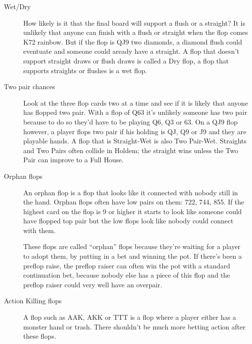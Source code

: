 \begin{description}

\item[Wet/Dry] How likely is it that the final board will support a
flush or a straight? It is unlikely that anyone can finish with a
flush or straight when the flop comes K72 rainbow. But if the flop is
QJ9 two diamonds, a diamond flush could eventuate and someone could
aready have a straight. A flop that doesn't support straight draws or
flush draws is called a Dry flop, a flop that supports straights or
flushes is a wet flop.

\item[Two pair chances] Look at the three flop cards two at a time and
see if it is likely that anyone has flopped two pair. With a flop of
Q63 it's unlikely someone has two pair because to do so they'd have to
be playing Q6, Q3 or 63. On a QJ9 flop however, a player flops two
pair if his holding is QJ, Q9 or J9 and they are playable hands.
A flop that is Straight-Wet is also Two Pair-Wet. Straights and Two
Pairs often collide in Holdem; the straight wins unless the Two Pair
can improve to a Full House.

\item[Orphan flops] An orphan flop is a flop that looks like it
connected with nobody still in the hand. Orphan flops often have low
pairs on them: 722, 744, 855. If the highest card on the flop is 9 or
higher it starts to look like someone could have flopped top pair but
the low flops look like nobody could connect with them.

These flops are called ``orphan'' flops because they're waiting for a
player to adopt them, by putting in a bet and winning the pot. If
there's been a preflop raise, the preflop raiser can often win the pot
with a standard continuation bet, because nobody else has a piece of
this flop and the preflop raiser could very well have an overpair.

\item[Action Killing flops] A flop such as AAK, AKK or TTT is a flop
where a player either has a monster hand or trash. There shouldn't be
much more betting action after these flops.

\end{description}
